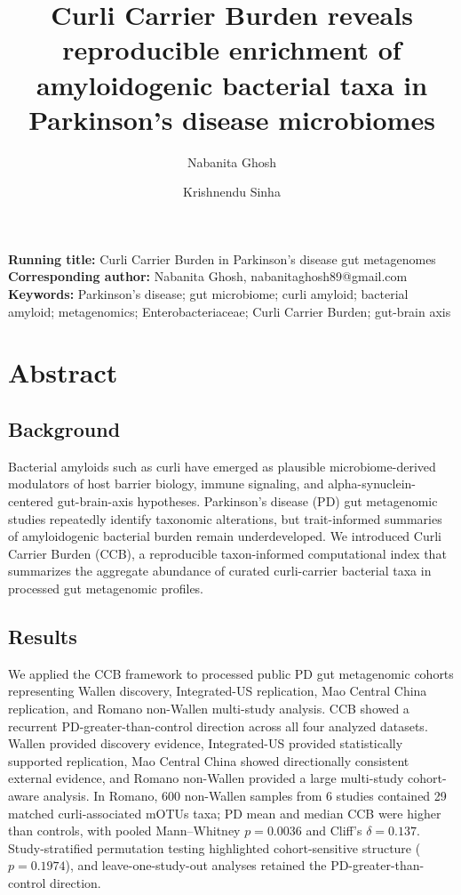 \documentclass[12pt]{article}
\title{Curli Carrier Burden reveals reproducible enrichment of amyloidogenic bacterial taxa in Parkinson's disease microbiomes}
\author[1]{Nabanita Ghosh}
\author[2]{Krishnendu Sinha}
\affil[1]{Department of Zoology, Maulana Azad College, Kolkata, India}
\affil[2]{Department of Zoology, Jhargram Raj College, Jhargram, India}
\date{}
\begin{document}
\maketitle

\noindent\textbf{Running title:} Curli Carrier Burden in Parkinson's disease gut metagenomes\\
\textbf{Corresponding author:} Nabanita Ghosh, nabanitaghosh89@gmail.com\\
\textbf{Keywords:} Parkinson's disease; gut microbiome; curli amyloid; bacterial amyloid; metagenomics; Enterobacteriaceae; Curli Carrier Burden; gut-brain axis

\section*{Abstract}
\subsection*{Background}
Bacterial amyloids such as curli have emerged as plausible microbiome-derived modulators of host barrier biology, immune signaling, and alpha-synuclein-centered gut-brain-axis hypotheses. Parkinson's disease (PD) gut metagenomic studies repeatedly identify taxonomic alterations, but trait-informed summaries of amyloidogenic bacterial burden remain underdeveloped. We introduced Curli Carrier Burden (CCB), a reproducible taxon-informed computational index that summarizes the aggregate abundance of curated curli-carrier bacterial taxa in processed gut metagenomic profiles.

\subsection*{Results}
We applied the CCB framework to processed public PD gut metagenomic cohorts representing Wallen discovery, Integrated-US replication, Mao Central China replication, and Romano non-Wallen multi-study analysis. CCB showed a recurrent PD-greater-than-control direction across all four analyzed datasets. Wallen provided discovery evidence, Integrated-US provided statistically supported replication, Mao Central China showed directionally consistent external evidence, and Romano non-Wallen provided a large multi-study cohort-aware analysis. In Romano, 600 non-Wallen samples from 6 studies contained 29 matched curli-associated mOTUs taxa; PD mean and median CCB were higher than controls, with pooled Mann--Whitney $p=0.0036$ and Cliff's $\delta=0.137$. Study-stratified permutation testing highlighted cohort-sensitive structure ($p=0.1974$), and leave-one-study-out analyses retained the PD-greater-than-control direction.
\end{document}
